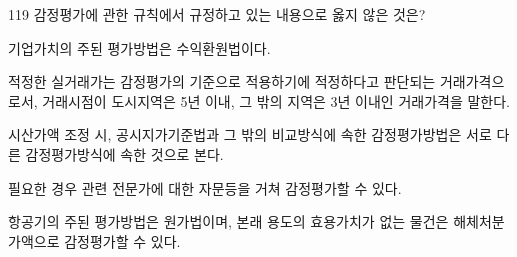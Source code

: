 \begin{question}{119}
감정평가에 관한 규칙에서 규정하고 있는 내용으로 옳지 않은 것은?
\begin{choices}
  \item 기업가치의 주된 평가방법은 수익환원법이다.
  \item 적정한 실거래가는 감정평가의 기준으로 적용하기에 적정하다고 판단되는 거래가격으로서, 거래시점이 도시지역은 5년 이내, 그 밖의 지역은 3년 이내인 거래가격을 말한다.
  \item 시산가액 조정 시, 공시지가기준법과 그 밖의 비교방식에 속한 감정평가방법은 서로 다른 감정평가방식에 속한 것으로 본다.
  \item 필요한 경우 관련 전문가에 대한 자문등을 거쳐 감정평가할 수 있다.
  \item 항공기의 주된 평가방법은 원가법이며, 본래 용도의 효용가치가 없는 물건은 해체처분가액으로 감정평가할 수 있다.
\end{choices}
\end{question}
